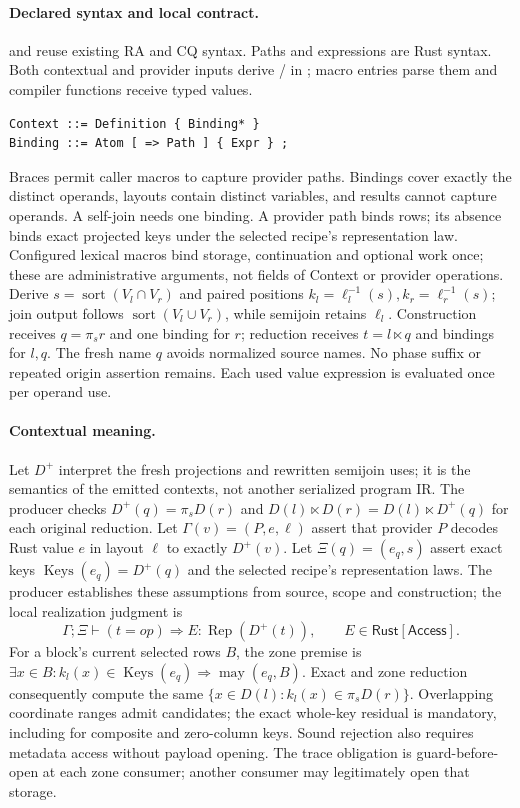 \paragraph{Declared syntax and local contract.}
 and  reuse existing RA and CQ syntax. Paths and
expressions are Rust syntax. Both contextual and provider inputs derive
/ in ; macro entries parse them and compiler
functions receive typed values.
\begin{lstlisting}
Context ::= Definition { Binding* }
Binding ::= Atom [ => Path ] { Expr } ;
\end{lstlisting}
Braces permit caller macros to capture provider paths. Bindings cover exactly
the distinct operands, layouts contain distinct variables, and results cannot
capture operands. A self-join needs one binding. A provider path binds rows;
its absence binds exact projected keys under the selected recipe's representation
law. Configured lexical macros bind storage, continuation and optional work once;
these are administrative arguments, not fields of Context or provider operations.
Derive $s=\operatorname{sort}(V_l\cap V_r)$ and paired positions
$k_l=\ell_l^{-1}(s),k_r=\ell_r^{-1}(s)$; join output follows
$\operatorname{sort}(V_l\cup V_r)$, while semijoin retains $\ell_l$.
Construction receives $q=\pi_s r$ and one binding for $r$; reduction receives
$t=l\ltimes q$ and bindings for $l,q$. The fresh name $q$ avoids normalized
source names. No phase suffix or repeated origin assertion remains.
Each used value expression is evaluated once per operand use.

\paragraph{Contextual meaning.}
Let $D^+$ interpret the fresh projections and rewritten semijoin uses; it is
the semantics of the emitted contexts, not another serialized program IR.
The producer checks $D^+(q)=\pi_sD(r)$ and
$D(l)\ltimes D(r)=D(l)\ltimes D^+(q)$ for each original reduction.
Let $\Gamma(v)=(P,e,\ell)$ assert that provider $P$ decodes Rust value $e$ in
layout $\ell$ to exactly $D^+(v)$. Let $\Xi(q)=(e_q,s)$ assert exact keys
$\operatorname{Keys}(e_q)=D^+(q)$ and the selected recipe's representation laws.
The producer establishes these assumptions from source, scope and construction;
the local realization judgment is
\[
 \Gamma;\Xi\vdash (t=\mathit{op})\Longrightarrow
       E:\operatorname{Rep}(D^+(t)),\qquad E\in\mathsf{Rust}[\mathsf{Access}].
\]
For a block's current selected rows $B$, the zone premise is
$\exists x\in B:k_l(x)\in\operatorname{Keys}(e_q)\Rightarrow
\operatorname{may}(e_q,B)$. Exact and zone reduction consequently compute the same
$\{x\in D(l):k_l(x)\in\pi_sD(r)\}$. Overlapping coordinate ranges admit
candidates; the exact whole-key residual is mandatory, including for composite
and zero-column keys. Sound rejection also requires metadata access without
payload opening. The trace obligation is guard-before-open at each zone consumer;
another consumer may legitimately open that storage.

